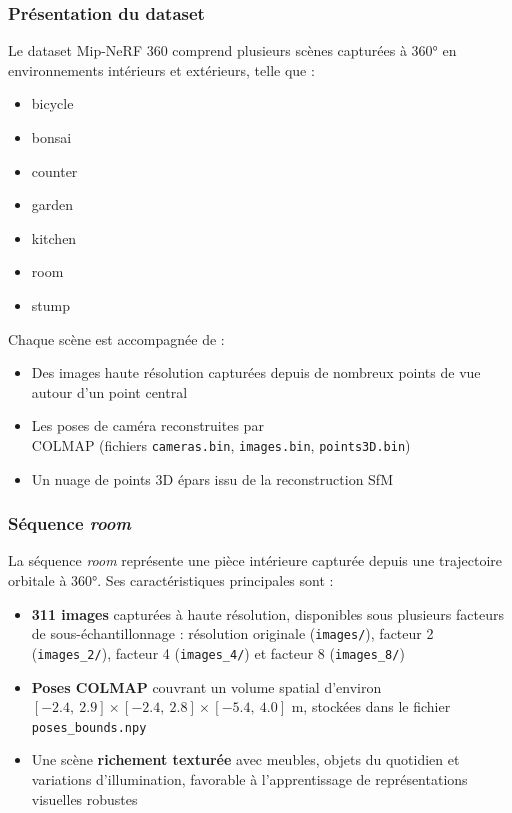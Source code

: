 \subsubsection{Présentation du dataset}

Le dataset Mip-NeRF 360 comprend plusieurs scènes capturées à 360° en environnements intérieurs et extérieurs, telle que : 

\begin{itemize}
    \item bicycle
    \item bonsai
    \item counter
    \item garden
    \item kitchen
    \item room
    \item stump
\end{itemize}
Chaque scène est accompagnée de :

\begin{itemize}[noitemsep, topsep=4pt]
    \item Des images haute résolution capturées depuis de nombreux points 
    de vue autour d'un point central
    \item Les poses de caméra reconstruites par \\COLMAP 
    (fichiers \texttt{cameras.bin}, \texttt{images.bin}, 
    \texttt{points3D.bin})
    \item Un nuage de points 3D épars issu de la reconstruction SfM
\end{itemize}

\subsubsection*{Séquence \textit{room}}

La séquence \textit{room} représente une pièce intérieure capturée depuis 
une trajectoire orbitale à 360°. Ses caractéristiques principales sont :

\begin{itemize}[noitemsep, topsep=3pt]
    \item \textbf{311 images} capturées à haute résolution, disponibles 
    sous plusieurs facteurs de sous-échantillonnage : résolution originale 
    (\texttt{images/}), facteur 2 (\texttt{images\_2/}), facteur 4 
    (\texttt{images\_4/}) et facteur 8 (\texttt{images\_8/})
    \item \textbf{Poses COLMAP} couvrant un volume spatial d'environ 
    $[-2.4,\ 2.9] \times [-2.4,\ 2.8] \times [-5.4,\ 4.0]$ m, 
    stockées dans le fichier \texttt{poses\_bounds.npy}
    \item Une scène \textbf{richement texturée} avec meubles, objets 
    du quotidien et variations d'illumination, favorable à l'apprentissage 
    de représentations visuelles robustes
\end{itemize}


